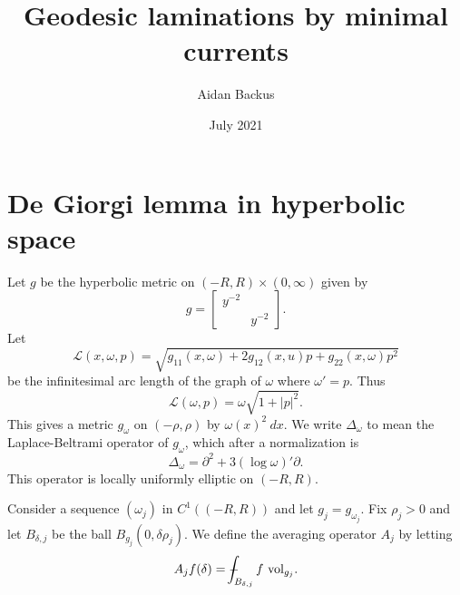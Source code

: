 \documentclass[reqno,12pt,letterpaper]{amsart}
\title[Geodesic laminations by minimal currents]{Geodesic laminations by minimal currents}
\author{Aidan Backus}
\date{July 2021}
\newcommand{\vol}{\mathrm{vol}}
\theoremstyle{definition}
\numberwithin{equation}{section}
\def\Xint#1{\mathchoice
{\XXint\displaystyle\textstyle{#1}}%
{\XXint\textstyle\scriptstyle{#1}}%
{\XXint\scriptstyle\scriptscriptstyle{#1}}%
{\XXint\scriptscriptstyle\scriptscriptstyle{#1}}%
\!\int}
\def\XXint#1#2#3{{\setbox0=\hbox{$#1{#2#3}{\int}$ }
\vcenter{\hbox{$#2#3$ }}\kern-.6\wd0}}
\def\dashint{\Xint-}
\begin{document}


\section{De Giorgi lemma in hyperbolic space}
Let $g$ be the hyperbolic metric on $(-R, R) \times (0, \infty)$ given by
$$g = \begin{bmatrix}y^{-2} \\ & y^{-2}\end{bmatrix}.$$
Let
$$\mathscr L(x, \omega, p) = \sqrt{g_{11}(x, \omega) + 2g_{12}(x, u)p + g_{22}(x, \omega) p^2}$$
be the infinitesimal arc length of the graph of $\omega$ where $\omega' = p$.
Thus
$$\mathscr L(\omega, p) = \omega \sqrt{1 + |p|^2}.$$
This gives a metric $g_\omega$ on $(-\rho, \rho)$ by $\omega(x)^2 ~dx$.
We write $\Delta_\omega$ to mean the Laplace-Beltrami operator of $g_\omega$, which after a normalization is
$$\Delta_\omega = \partial^2 + 3(\log \omega)' \partial.$$
This operator is locally uniformly elliptic on $(-R, R)$.

Consider a sequence $(\omega_j)$ in $C^1((-R, R))$ and let $g_j = g_{\omega_j}$.
Fix $\rho_j > 0$ and let $B_{\delta,j}$ be the ball $B_{g_j}(0, \delta \rho_j)$.
We define the averaging operator $A_j$ by letting
$$A_jf(\delta) = \dashint_{B_{\delta,j}} f ~\vol_{g_j}.$$
\end{document}
